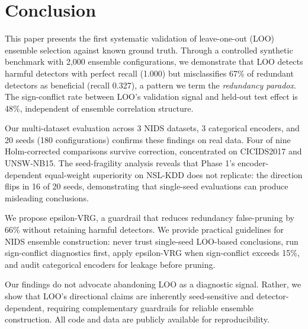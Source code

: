 \section{Conclusion}
\label{sec:conclusion}

This paper presents the first systematic validation of leave-one-out (LOO) ensemble selection against known ground truth. Through a controlled synthetic benchmark with 2,000 ensemble configurations, we demonstrate that LOO detects harmful detectors with perfect recall (1.000) but misclassifies 67\% of redundant detectors as beneficial (recall 0.327), a pattern we term the \emph{redundancy paradox}. The sign-conflict rate between LOO's validation signal and held-out test effect is 48\%, independent of ensemble correlation structure.

Our multi-dataset evaluation across 3 NIDS datasets, 3 categorical encoders, and 20 seeds (180 configurations) confirms these findings on real data. Four of nine Holm-corrected comparisons survive correction, concentrated on CICIDS2017 and UNSW-NB15. The seed-fragility analysis reveals that Phase 1's encoder-dependent equal-weight superiority on NSL-KDD does not replicate: the direction flips in 16 of 20 seeds, demonstrating that single-seed evaluations can produce misleading conclusions.

We propose epsilon-VRG, a guardrail that reduces redundancy false-pruning by 66\% without retaining harmful detectors. We provide practical guidelines for NIDS ensemble construction: never trust single-seed LOO-based conclusions, run sign-conflict diagnostics first, apply epsilon-VRG when sign-conflict exceeds 15\%, and audit categorical encoders for leakage before pruning.

Our findings do not advocate abandoning LOO as a diagnostic signal. Rather, we show that LOO's directional claims are inherently seed-sensitive and detector-dependent, requiring complementary guardrails for reliable ensemble construction. All code and data are publicly available for reproducibility.
